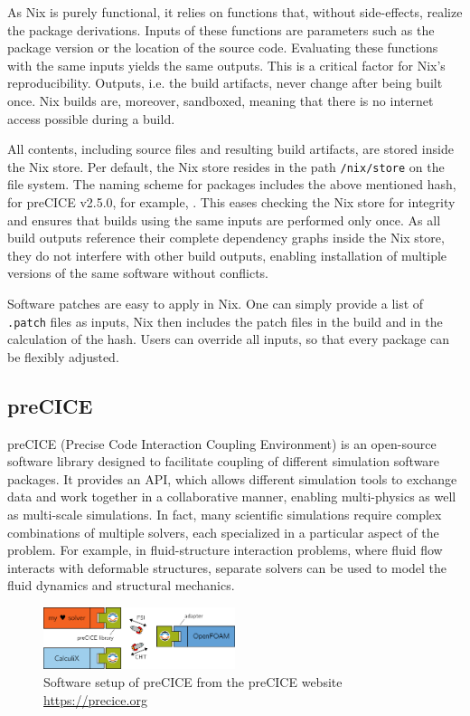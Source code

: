 \documentclass{eceasst}
\begin{document}
As Nix is purely functional, it relies on functions that, without side-effects, realize the package derivations.
Inputs of these functions are parameters such as the package version or the location of the source code.
Evaluating these functions with the same inputs yields the same outputs.
This is a critical factor for Nix's reproducibility.
Outputs, i.e. the build artifacts, never change after being built once.
Nix builds are, moreover, sandboxed, meaning that there is no internet access possible during a build.

All contents, including source files and resulting build artifacts, are stored inside the Nix store.
Per default, the Nix store resides in the path \texttt{/nix/store} on the file system.
The naming scheme for packages includes the above mentioned hash, for preCICE v2.5.0, for example, 
.
This eases checking the Nix store for integrity and ensures that builds using the same inputs are performed only once.
As all build outputs reference their complete dependency graphs inside the Nix store, they do not interfere with other build outputs, enabling installation of multiple versions of the same software without conflicts.

Software patches are easy to apply in Nix.
One can simply provide a list of \texttt{.patch} files as inputs, Nix then includes the patch files in the build and in the calculation of the hash.
Users can override all inputs, so that every package can be flexibly adjusted.


\subsection{preCICE}

preCICE (Precise Code Interaction Coupling Environment) is an open-source software library designed to facilitate coupling of different simulation software packages.
It provides an API, which allows different simulation tools to exchange data and work together in a collaborative manner, enabling multi-physics as well as multi-scale simulations.
In fact, many scientific simulations require complex combinations of multiple solvers, each specialized in a particular aspect of the problem.
For example, in fluid-structure interaction problems, where fluid flow interacts with deformable structures, separate solvers can be used to model the fluid dynamics and structural mechanics.

\begin{figure}
    \centering
    \includegraphics[width=0.5\textwidth]{figures/precice.png}
    \caption{Software setup of preCICE from the preCICE website \url{https://precice.org}}
    \label{fig:precice}
\end{figure}
\end{document}
